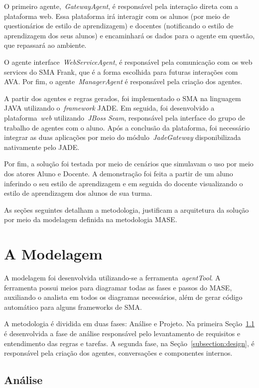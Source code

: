 O primeiro agente,~\emph{GatewayAgent}, é responsável pela interação direta com a plataforma web. Essa plataforma irá interagir com os alunos (por meio de questionários de estilo de aprendizagem) e docentes (notificando o estilo de aprendizagem dos seus alunos) e encaminhará os dados para o agente em questão, que repassará ao ambiente.

O agente interface~\emph{WebServiceAgent}, é responsável pela comunicação com os web services do SMA Frank, que é a forma escolhida para futuras interações com AVA. Por fim, o agente~\emph{ManagerAgent} é responsável pela criação dos agentes.

A partir dos agentes e regras gerados, foi implementado o SMA na linguagem JAVA utilizando o~\emph{framework} JADE. Em seguida, foi desenvolvido a plataforma~\emph{web} utilizando~\emph{JBoss Seam}, responsável pela interface do grupo de trabalho de agentes com o aluno. Após a conclusão da plataforma, foi necessário integrar as duas aplicações por meio do módulo~\emph{JadeGateway} disponibilizada nativamente pelo JADE.

Por fim, a solução foi testada por meio de cenários que simulavam o uso por meio dos atores Aluno e Docente. A demonstração foi feita a partir de um aluno inferindo o seu estilo de aprendizagem e em seguida do docente visualizando o estilo de aprendizagem dos alunos de sua turma.

As seções seguintes detalham a metodologia, justificam a arquitetura da solução por meio da modelagem definida na metodologia MASE.

\section{A Modelagem}\label{section:modelagem}

A modelagem foi desenvolvida utilizando-se a ferramenta~\emph{agentTool}. A ferramenta possui meios para diagramar todas as fases e passos do MASE, auxiliando o analista em todos os diagramas necessários, além de gerar código automático para alguns frameworks de SMA.

A metodologia é dividida em duas fases: Análise e Projeto. Na primeira Seção~\ref{subsection:analise} é desenvolvida a fase de análise responsável pelo levantamento de requisitos e entendimento das regras e tarefas. A segunda fase, na Seção~\ref{subsection:design}, é responsável pela criação dos agentes, conversações e componentes internos.

\subsection{Análise}\label{subsection:analise}

